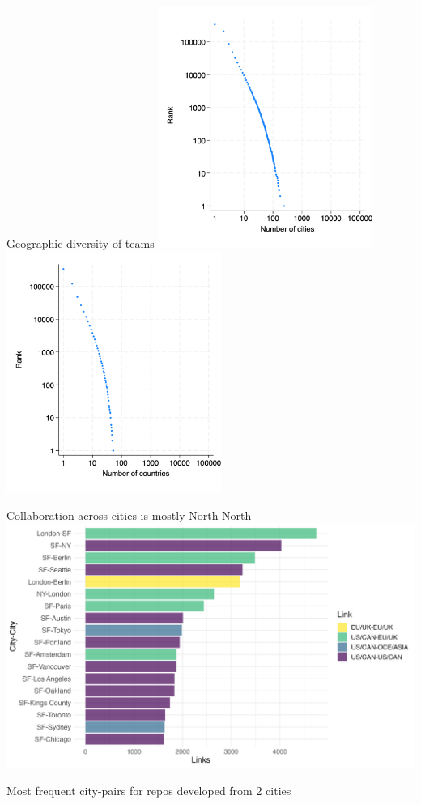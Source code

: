 \documentclass[
  ignorenonframetext,
  aspectratio=1610,
]{beamer}
\begin{document}
\begin{frame}{Geographic diversity of teams}
\protect\hypertarget{geographic-diversity-of-teams}{}
\includegraphics[width=7cm,height=\textheight]{figures/cities_rank.png}
\includegraphics[width=7cm,height=\textheight]{figures/countries_rank.png}
\end{frame}

\begin{frame}{Collaboration across cities is mostly North-North}
\protect\hypertarget{collaboration-across-cities-is-mostly-north-north}{}
\includegraphics{figures/most_linked_city_pairs.png}

Most frequent city-pairs for repos developed from 2 cities
\end{frame}
\end{document}
